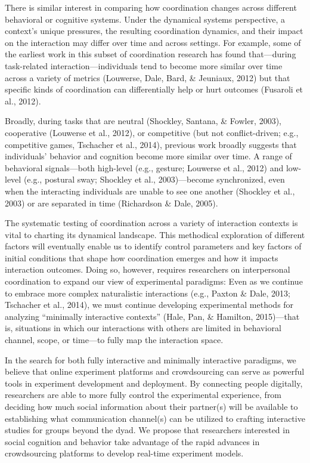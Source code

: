 \documentclass[10pt, letterpaper]{article}
\begin{document}
There is similar interest in comparing how coordination changes across
different behavioral or cognitive systems. Under the dynamical systems
perspective, a context's unique pressures, the resulting coordination
dynamics, and their impact on the interaction may differ over time and
across settings. For example, some of the earliest work in this subset
of coordination research has found that---during task-related
interaction---individuals tend to become more similar over time across a
variety of metrics (Louwerse, Dale, Bard, \& Jeuniaux, 2012) but that
specific kinds of coordination can differentially help or hurt outcomes
(Fusaroli et al., 2012).

Broadly, during tasks that are neutral (Shockley, Santana, \& Fowler,
2003), cooperative (Louwerse et al., 2012), or competitive (but not
conflict-driven; e.g., competitive games, Tschacher et al., 2014),
previous work broadly suggests that individuals' behavior and cognition
become more similar over time. A range of behavioral signals---both
high-level (e.g., gesture; Louwerse et al., 2012) and low-level (e.g.,
postural sway; Shockley et al., 2003)---become synchronized, even when
the interacting individuals are unable to see one another (Shockley et
al., 2003) or are separated in time (Richardson \& Dale, 2005).

The systematic testing of coordination across a variety of interaction
contexts is vital to charting its dynamical landscape. This methodical
exploration of different factors will eventually enable us to identify
control parameters and key factors of initial conditions that shape how
coordination emerges and how it impacts interaction outcomes. Doing so,
however, requires researchers on interpersonal coordination to expand
our view of experimental paradigms: Even as we continue to embrace more
complex naturalistic interactions (e.g., Paxton \& Dale, 2013; Tschacher
et al., 2014), we must continue developing experimental methods for
analyzing ``minimally interactive contexts'' (Hale, Pan, \& Hamilton,
2015)---that is, situations in which our interactions with others are
limited in behavioral channel, scope, or time---to fully map the
interaction space.

In the search for both fully interactive and minimally interactive
paradigms, we believe that online experiment platforms and crowdsourcing
can serve as powerful tools in experiment development and deployment. By
connecting people digitally, researchers are able to more fully control
the experimental experience, from deciding how much social information
about their partner(s) will be available to establishing what
communication channel(s) can be utilized to crafting interactive studies
for groups beyond the dyad. We propose that researchers interested in
social cognition and behavior take advantage of the rapid advances in
crowdsourcing platforms to develop real-time experiment models.
\end{document}
